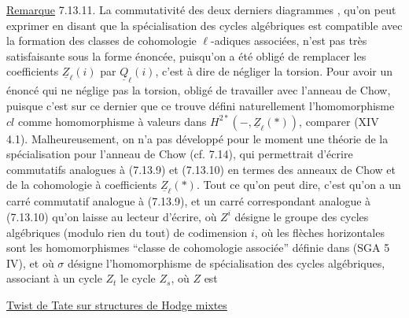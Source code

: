  \uline{Remarque} 7.13.11. La commutativité des deux derniers diagrammes , qu'on peut exprimer en disant que la spécialisation des cycles algébriques est compatible avec la formation des classes de cohomologie $\ell$-adiques associées, n'est pas très satisfaisante sous la forme énoncée, puisqu'on  a été obligé de remplacer les coefficients $\underline Z_{\ell}(i)$ par $\underline Q_{\ell}(i)$, c'est à dire de négliger la torsion. Pour avoir un énoncé qui ne néglige pas la torsion,  obligé de travailler avec l'anneau de Chow, puisque c'est sur ce dernier que ce trouve défini naturellement l'homomorphisme $cl$ comme homomorphisme à valeurs dans $H^{2*}(-,\underline Z_{\ell}(*))$,  comparer (XIV 4.1). Malheureusement, on n'a pas développé pour le moment une théorie de la spécialisation pour l'anneau de Chow\deleted{\unsure{,}} (cf. 7.14), qui permettrait d'écrire  commutatifs analogues à (7.13.9) et (7.13.10) en termes des anneaux de Chow et de la cohomologie à coefficients $\underline Z_{\ell}(*)$. Tout ce qu'on peut dire,  c'est qu'on a un carré commutatif
 analogue à (7.13.9), et un carré correspondant analogue à (7.13.10) qu'on laisse au lecteur  d'écrire, où $Z^i$ désigne le groupe des cycles algébriques (modulo rien du tout) de codimension $i$,  où les flèches horizontales sont les homomorphismes ``classe de cohomologie associée'' définie dans (SGA 5 IV), et où $\sigma$ désigne l'homomorphisme de spécialisation des cycles algébriques, associant à un cycle $Z_t$ le cycle $Z_s$, où $Z$ est

\uline{Twist de Tate sur structures de Hodge mixtes}

